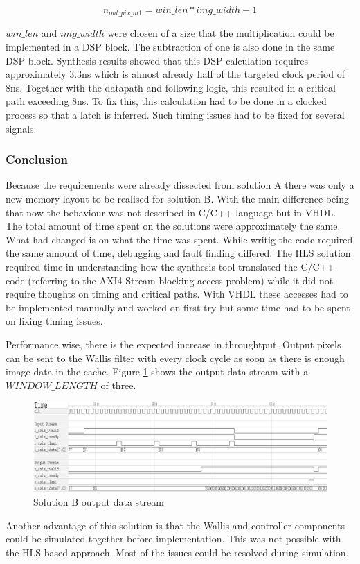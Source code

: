 \begin{equation}
    n_{out\_pix\_m1} = win\_len*img\_width - 1
    \label{eq:noutpix}
\end{equation}

$win\_len$ and $img\_width$ were chosen of a size that the multiplication could
be implemented in a DSP block. The subtraction of one is also done in the same
DSP block. Synthesis results showed that this DSP calculation requires
approximately 3.3ns
which is almost already half of the targeted clock period of 8ns. Together with
the datapath and following logic, this resulted in a critical path exceeding
8ns. To fix this,
this calculation had to be done in a clocked process so that a latch is
inferred. Such timing issues had to be fixed for several signals.

% 
\subsubsection*{Conclusion}
Because the requirements were already dissected from solution A there was only a
new memory layout to be realised for solution B. With the main difference being
that now the behaviour was not described in C/C++ language but in VHDL. The
total
amount of time spent on the solutions were approximately the same. What had
changed is on what the time was spent. While writig the code required the same
amount of time, debugging and fault finding differed. The HLS solution required
time in understanding how the synthesis tool translated the C/C++ code (referring
to the AXI4-Stream blocking access problem) while it did not require thoughts on
timing
and critical paths. With VHDL these accesses had to be implemented manually and
worked on first try but some time had to be spent on fixing timing issues.

Performance wise, there is the expected increase in throughtput. Output pixels
can be sent to the Wallis filter with every clock cycle as soon as there is
enough image data in the cache. Figure \ref{fig:tracesolb} shows the output data
stream with a $WINDOW\_LENGTH$ of three. 

\begin{figure}[tb!]
    \centering
    \includegraphics[width=\textwidth]{images/controller/vhdlcontrollerout.png}
    \caption{Solution B output data stream}
    \label{fig:tracesolb}
\end{figure}

Another advantage of this solution is that the Wallis and controller components
could be simulated together before implementation. This was not possible with
the HLS based approach. Most of the issues could be resolved during simulation.



